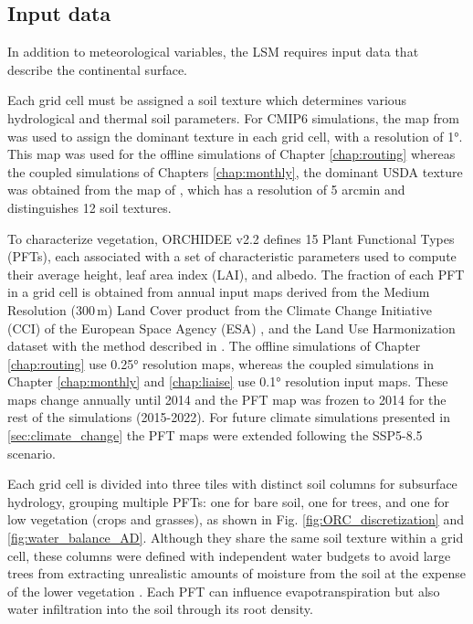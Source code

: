 \subsection{Input data}
\label{sec:ORCH_input_data}
In addition to meteorological variables, the LSM requires input data that describe the continental surface. 

Each grid cell must be assigned a soil texture which determines various hydrological and thermal soil parameters. 
For CMIP6 simulations, the map from \citet{zobler87802world} was used to assign the dominant texture in each grid cell, with a resolution of 1°. 
This map was used for the offline simulations of Chapter \ref{chap:routing}
whereas the coupled simulations of Chapters \ref{chap:monthly}, the dominant USDA texture was obtained from the map of \citet{reynolds_estimating_2000}, which has a resolution of 5 arcmin and distinguishes 12 soil textures.

To characterize vegetation, ORCHIDEE v2.2 defines 15 Plant Functional Types (PFTs), each associated with a set of characteristic parameters used to compute their average height, leaf area index (LAI), and albedo. 
The fraction of each PFT in a grid cell is obtained from annual input maps derived from the Medium Resolution (300\,m) Land Cover product from the Climate Change Initiative (CCI) of the European Space Agency (ESA) \citep{bontemps_multi-year_2015}, and the Land Use Harmonization dataset \citep[LUH, ][]{hurtt_harmonization_2020} with the method described in \citet{lurton_implementation_2020}.
The offline simulations of Chapter \ref{chap:routing} use 0.25° resolution maps, whereas the coupled simulations in Chapter \ref{chap:monthly} and \ref{chap:liaise} use 0.1° resolution input maps. These maps change annually until 2014 and the PFT map was frozen to 2014 for the rest of the simulations (2015-2022).
For future climate simulations presented in \ref{sec:climate_change} the PFT maps were extended following the SSP5-8.5 scenario.

Each grid cell is divided into three tiles with distinct soil columns for subsurface hydrology, grouping multiple PFTs: one for bare soil, one for trees, and one for low vegetation (crops and grasses), as shown in Fig. \ref{fig:ORC_discretization} and \ref{fig:water_balance_AD}. 
Although they share the same soil texture within a grid cell, these columns were 
defined with independent water budgets to avoid large trees from extracting unrealistic amounts of moisture from the soil at the expense of the lower vegetation \citep{de1999representation}. Each PFT can influence evapotranspiration but also water infiltration into the soil through its root density.

